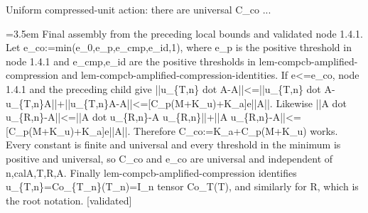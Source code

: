 \documentclass{article}
\newcommand{\step}[1]{\par\noindent\hangindent=3.5em\hangafter=1%
  \makebox[3.5em][l]{\textbf{#1.}}}
\newcommand{\steptag}[1]{\hfill{\small\textsf{[#1]}}}
\begin{document}
\begin{proofbox}{Uniform compressed-unit action: there are universal C\_co ...}
\step{1.4.2.1.2} Final assembly from the preceding local bounds and validated node 1.4.1. Let e\_co:=min(e\_0,e\_p,e\_cmp,e\_id,1), where e\_p is the positive threshold in node 1.4.1 and e\_cmp,e\_id are the positive thresholds in lem-compcb-amplified-compression and lem-compcb-amplified-compression-identities. If e<=e\_co, node 1.4.1 and the preceding child give ||u\_\{T,n\} dot A-A||<=||u\_\{T,n\} dot A-u\_\{T,n\}A||+||u\_\{T,n\}A-A||<=[C\_p(M+K\_u)+K\_a]e||A||. Likewise ||A dot u\_\{R,n\}-A||<=||A dot u\_\{R,n\}-A u\_\{R,n\}||+||A u\_\{R,n\}-A||<=[C\_p(M+K\_u)+K\_a]e||A||. Therefore C\_co:=K\_a+C\_p(M+K\_u) works. Every constant is finite and universal and every threshold in the minimum is positive and universal, so C\_co and e\_co are universal and independent of n,calA,T,R,A. Finally lem-compcb-amplified-compression identifies u\_\{T,n\}=Co\_\{T\_n\}(T\_n)=I\_n tensor Co\_T(T), and similarly for R, which is the root notation. \steptag{validated} \\[4pt]
\end{proofbox}
\end{document}
